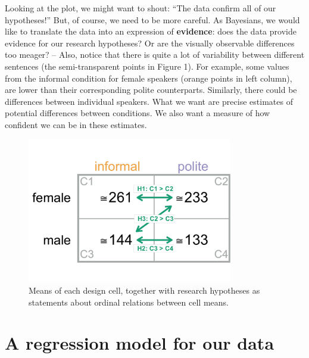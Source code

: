 \documentclass[nobib]{tufte-handout}
\begin{document}
Looking at the plot, we might want to shout: ``The data confirm all of our
hypotheses!'' But, of course, we need to be more careful. As Bayesians, we would like to
translate the data into an expression of \textbf{evidence}: does the data provide evidence for
our research hypotheses? Or are the visually observable differences too meager? -- Also, notice that
there is quite a lot of variability between different sentences (the semi-transparent points in Figure 1).
For example, some values from the informal condition for female speakers (orange points in left
column), are lower than their corresponding polite counterparts. Similarly, there could be differences between individual speakers. What we want are precise
estimates of potential differences between conditions. We also want a measure of how confident we can be in these estimates.

\begin{figure}[h]
  \centering
    \includegraphics[width = 0.8\textwidth]{pics/table_mean_hypotheses.pdf}
    \caption{Means of each design cell, together with research hypotheses as statements about ordinal relations between cell means.}
    \label{fig:BasicPlotData_table}
\end{figure}

\section{A regression model for our data}
\end{document}
